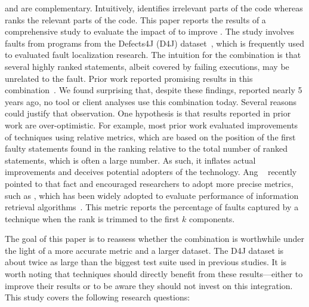 \documentclass[sigplan,10pt,review,anonymous]{acmart}\settopmatter{printfolios=true,printccs=false,printacmref=false}
\begin{document}

\ds{} and \sfl{} are complementary. Intuitively, \ds{} identifies
irrelevant parts of the code whereas \sfl{} ranks the relevant parts
of the code.  This paper reports the results of a comprehensive study
to evaluate the impact of \ds{} to improve \sfl{}. The study involves
\numFaults{} faults from \numPrograms{} programs from the Defects4J (D4J)
dataset~\cite{just-defects4j-issta2014}, which is frequently used to
evaluated fault localization research. The intuition for the \comb{}
combination is that several highly ranked statements, albeit covered
by failing executions, may be unrelated to the fault. Prior work
reported promising results in this combination~\cite{Wotawa:2010:FLB:1848650.1849235,Alves:2011:FUD:2190078.2190115,DBLP:conf/ecai/HoferW12,lei-mao-dai-wang-2012,slicing-sfl-repair}.
We found surprising that, despite these findings, reported nearly 5
years ago, no tool or client analyses use this combination
today. Several reasons could justify that observation. One hypothesis is that results reported in prior work are
over-optimistic. For example, most prior work evaluated improvements
of \sfl{} techniques using relative metrics, which are based on the
position of the first faulty statements found in the ranking relative
to the total number of ranked statements, which is often a large
number. As such, it inflates actual improvements and deceives
potential adopters of the technology. Ang \etal~\cite{ang-perez-van-deursen-rui-2017} recently
pointed to that fact and encouraged researchers to adopt more precise metrics,
such as \topk{}
\cite{Wu:2014:CLC:2610384.2610386,Lucia:2014:FFL:2642937.2642983,Wen:2016:LLB:2970276.2970359},
which has been widely adopted to evaluate performance of information retrieval algorithms~. This
metric reports the percentage of faults captured by a technique when
the rank is trimmed to the first $k$ components.

The goal of this paper is to reassess whether the \comb{} combination
is worthwhile under the light of a more accurate metric and a larger
dataset. The D4J dataset is about twice as large than the biggest test
suite used in previous studies. It is worth noting that \acrAbrev{}
techniques should directly benefit from these results---either to
improve their results or to be aware they should not invest on this
integration. This study covers the following research questions:
\end{document}
